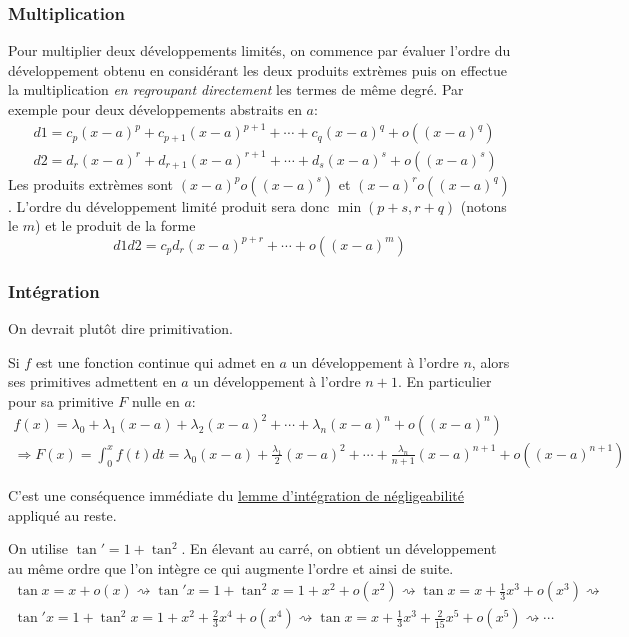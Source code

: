 \subsubsection{Multiplication}
Pour multiplier deux développements limités, on commence par évaluer l'ordre du développement obtenu en considérant les deux produits extrèmes puis on effectue la multiplication \emph{en regroupant directement} les termes de même degré.\newline
Par exemple pour deux développements abstraits en $a$:
\begin{align*}
 &d1 = c_p(x-a)^p+c_{p+1}(x-a)^{p+1}+\cdots +c_q(x-a)^q+o\left((x-a)^q\right)\\
 &d2 = d_r(x-a)^r+d_{r+1}(x-a)^{r+1}+\cdots +d_s(x-a)^s+o\left((x-a)^s\right)
\end{align*}
Les produits extrèmes sont $(x-a)^po\left((x-a)^s\right)$ et $(x-a)^ro\left((x-a)^q\right)$. L'ordre du développement limité produit sera donc $\min(p+s,r+q)$ (notons le $m$) et le produit de la forme
\begin{displaymath}
 d1d2 = c_pd_r(x-a)^{p+r} + \cdots +o\left((x-a)^m \right) 
\end{displaymath}

\subsubsection{Intégration}
On devrait plutôt dire primitivation.
\begin{prop}
 Si $f$ est une fonction continue qui admet en $a$ un développement à l'ordre $n$, alors ses primitives admettent en $a$ un développement à l'ordre $n+1$. En particulier pour sa primitive $F$ nulle en $a$:
\begin{multline*}
 f(x)= \lambda_0 + \lambda_1(x-a)+ \lambda_2(x-a)^2+\cdots+ \lambda_n(x-a)^n+o((x-a)^n)\\
\Rightarrow F(x)=\int_0^xf(t)dt = \lambda_0(x-a) + \frac{\lambda_1}{2}(x-a)^2+\cdots+ \frac{\lambda_n}{n+1}(x-a)^{n+1}+o((x-a)^{n+1})
\end{multline*}
\end{prop}
\begin{demo}
 C'est une conséquence immédiate du \href{\baseurl C2190.pdf}{lemme d'intégration de négligeabilité} appliqué au reste.
\end{demo}
\begin{exple}
 On utilise $\tan'=1+\tan^2$. En élevant au carré, on obtient un développement au même ordre que l'on intègre ce qui augmente l'ordre et ainsi de suite.
\begin{multline*}
 \tan x = x+o(x)\rightsquigarrow \tan'x = 1+\tan^2 x = 1+x^2 +o(x^2)\rightsquigarrow
 \tan x = x+\frac{1}{3}x^3 +o(x^3)\rightsquigarrow \\
\tan'x = 1+\tan^2 x = 1+x^2 +\frac{2}{3}x^4+o(x^4)\rightsquigarrow
\tan x = x+\frac{1}{3}x^3 +\frac{2}{15}x^5 +o(x^5)\rightsquigarrow \cdots
\end{multline*}
\end{exple}


